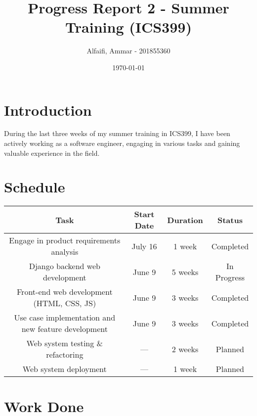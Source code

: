 \documentclass{article}
\title{Progress Report 2 - Summer Training (ICS399)}
\author{Alfaifi, Ammar - 201855360}
\date{\today}
\begin{document}
\maketitle

\section{Introduction}
During the last three weeks of my summer training in ICS399, I have been actively working as a software engineer, engaging in various tasks and gaining valuable experience in the field.

\section{Schedule}

\begin{tabular}{|c|c|c|c|}
	\hline
	\textbf{Task}                                       & \textbf{Start Date} & \textbf{Duration} & \textbf{Status} \\
	\hline
	Engage in product requirements analysis             & July 16          & 1 week           & Completed       \\
	Django backend web development                      & June 9          & 5 weeks           & In Progress     \\
	Front-end web development (HTML, CSS, JS)           & June 9          & 3 weeks           & Completed       \\
	Use case implementation and new feature development & June 9          & 3 weeks           & Completed       \\
	Web system testing \& refactoring                   & ---          & 2 weeks           & Planned         \\
	Web system deployment                               & ---          & 1 week            & Planned         \\
	\hline
\end{tabular}



\section{Work Done}
\end{document}
